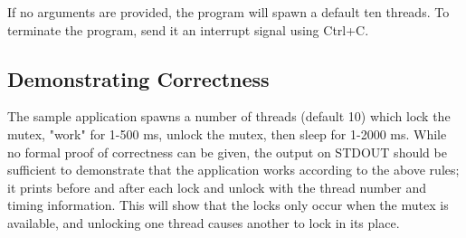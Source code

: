 \documentclass[onecolumn, draftclsnofoot,10pt, compsoc]{IEEEtran}
\begin{document}
If no arguments are provided, the program will spawn a default ten threads. To terminate the program, send it an interrupt signal using Ctrl+C.

\subsection*{Demonstrating Correctness}
The sample application spawns a number of threads (default 10) which lock the mutex, "work" for 1-500 ms, unlock the mutex, then sleep for 1-2000 ms. While no formal proof of correctness can be given, the output on STDOUT should be sufficient to demonstrate that the application works according to the above rules; it prints before and after each lock and unlock with the thread number and timing information. This will show that the locks only occur when the mutex is available, and unlocking one thread causes another to lock in its place.
\end{document}
